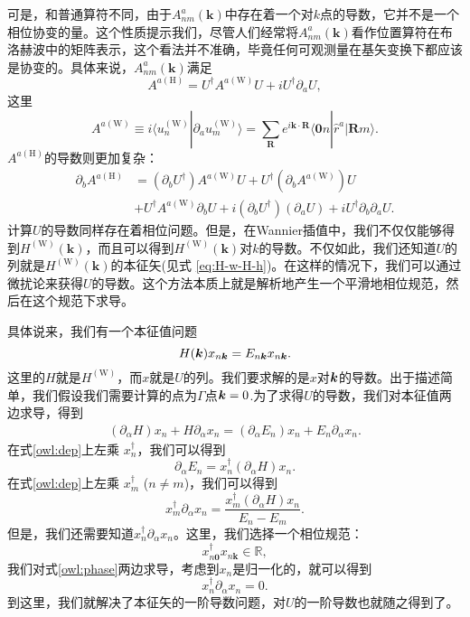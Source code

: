 可是，和普通算符不同，由于$A_{nm}^{a}(\mathbf{k})$中存在着一个对$k$点的导数，它并不是一个相位协变的量。这个性质提示我们，尽管人们经常将$A_{nm}^{a}(\mathbf{k})$看作位置算符在布洛赫波中的矩阵表示，这个看法并不准确，毕竟任何可观测量在基矢变换下都应该是协变的。具体来说，$A_{nm}^{a}(\mathbf{k})$满足\cite{wang_textitab_2006} 
\begin{equation}
A^{a(\textrm{H})}=U^{\dagger}A^{a(\textrm{W})}U+iU^{\dagger}\partial_{a}U,\label{eq:A-H-A-W}
\end{equation}
这里
\begin{equation}
A^{a(\textrm{W})}\equiv i\langle u_{n}^{(\textrm{W})}|\partial_{a}u_{m}^{(\textrm{W})}\rangle=\sum_{\mathbf{R}}e^{i\mathbf{k}\cdot\mathbf{R}}\langle\mathbf{0}n|\hat{r}^{a}|\mathbf{R}m\rangle.
\end{equation}
$A^{a(\textrm{H})}$的导数则更加复杂：
\begin{align}
\partial_{b}A^{a(\textrm{H})} & =(\partial_{b}U^{\dagger})A^{a(\textrm{W})}U+U^{\dagger}(\partial_{b}A^{a(\textrm{W})})U\\
& +U^{\dagger}A^{a(\textrm{W})}\partial_{b}U+i(\partial_{b}U^{\dagger})(\partial_{a}U)+iU^{\dagger}\partial_{b}\partial_{a}U.
\end{align}
计算$U$的导数同样存在着相位问题。但是，在Wannier插值中，我们不仅仅能够得到$H^{(\textrm{W})}(\mathbf{k})$，而且可以得到$H^{(\textrm{W})}(\mathbf{k})$对$k$的导数。不仅如此，我们还知道$U$的列就是$H^{(\textrm{W})}(\mathbf{k})$的本征矢(见式 \ref{eq:H-w-H-h})。在这样的情况下，我们可以通过微扰论来获得$U$的导数。这个方法本质上就是解析地产生一个平滑地相位规范，然后在这个规范下求导。

具体说来，我们有一个本征值问题
\begin{equation}
H(\boldsymbol{k})x_{n\boldsymbol{k}} = E_{n\boldsymbol{k}}x_{n\boldsymbol{k}}.
\end{equation}
这里的$H$就是$H^{\mathrm{(W)}}$，而$x$就是$U$的列。我们要求解的是$x$对$\boldsymbol{k}$的导数。出于描述简单，我们假设我们需要计算的点为$\Gamma$点$\boldsymbol{k}=0$.为了求得$U$的导数，我们对本征值两边求导，得到
\begin{align}
(\partial_\alpha H) x_n+H \partial_\alpha x_n = (\partial_\alpha E_n) x_n + E_n \partial_\alpha x_n.\label{owl:dep}
\end{align}
在式\ref{owl:dep}上左乘 $x_n^\dagger$，我们可以得到
\begin{equation}
\partial_\alpha E_{n}=x_{n}^{\dagger}(\partial_\alpha H) x_{n}.
\end{equation}
在式\ref{owl:dep}上左乘 $x_m^\dagger$ ($n\ne m$)，我们可以得到
\begin{equation}
x_{m}^{\dagger}\partial_\alpha x_{n}=\frac{x_{m}^{\dagger}(\partial_\alpha H)x_{n}}{E_n-E_m}.
\end{equation}
但是，我们还需要知道$x_{n}^{\dagger}\partial_\alpha x_{n}$。这里，我们选择一个相位规范：
\begin{equation}
x_{n\boldsymbol{0}}^{\dagger} x_{n\boldsymbol{k}}\in\mathbb{R},\label{owl:phase}
\end{equation}
我们对式\ref{owl:phase}两边求导，考虑到$x_n$是归一化的，就可以得到
\begin{equation}
x_{n}^{\dagger}\partial_\alpha x_n=0.
\end{equation}
到这里，我们就解决了本征矢的一阶导数问题，对$U$的一阶导数也就随之得到了。

